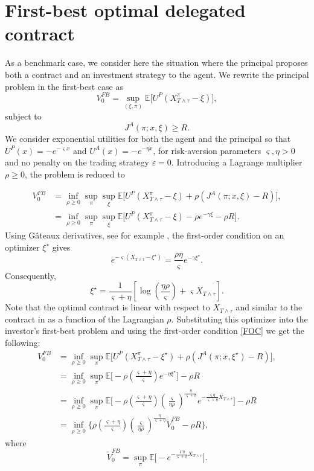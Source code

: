 \documentclass[11pt,a4paper]{article}
\theoremstyle{thmstyleone}%
\theoremstyle{thmstyletwo}%
\theoremstyle{thmstylethree}%
\begin{document}
\newpage
\appendix

\section{First-best optimal delegated contract}\label{FB-appendix}
As a benchmark case, we consider here the situation where the principal proposes both a contract and an investment strategy to the agent. We rewrite the principal problem in the first-best case as 
\[V^{FB}_0=\sup_{(\xi,\pi)} \mathbb E\Big[U^P(X^\pi_{T\wedge \tau}-\xi)\Big],\]
subject to 
\[J^A(\pi;x,\xi)\geq R.\]
We consider exponential utilities for both the agent and the principal so that $U^P(x)=-e^{-\varsigma x}$ and $U^A(x)=-e^{-\eta x}$, for risk-aversion parameters $\varsigma,\eta>0$ and no penalty on the trading strategy $\varepsilon=0$. 
Introducing a Lagrange multiplier $\rho\geq 0$, the problem is reduced to

\begin{align*}
V^{FB}_0&=\inf_{\rho\geq 0}\sup_{\pi}\sup_{\xi} \mathbb E\Big[U^P(X^\pi_{T\wedge \tau}-\xi)+\rho (J^A(\pi;x,\xi)-R) \Big],\\
&=\inf_{\rho\geq 0}\sup_{\pi}\sup_{\xi} \mathbb E\Big[U^P(X^\pi_{T\wedge \tau}-\xi)-\rho e^{-\gamma \xi}  -\rho R \Big].
\end{align*}
Using G\^ateaux derivatives, see for example \cite{mastrolia2018moral}, the first-order condition on an optimizer $\xi^\star$ gives
\begin{equation}\label{FOC}e^{-\varsigma (X_{T\wedge \tau}-\xi^\star)}=\frac{\rho \eta}\varsigma e^{-\gamma \xi^\star}.\end{equation}
Consequently,
\[\xi^\star= \frac1{\varsigma+\eta} [\log(\frac{\eta\rho}\varsigma)+\varsigma X_{T\wedge \tau}].\]
Note that the optimal contract is linear with respect to $X_{T\wedge \tau}$ and similar to the contract in \cite[Section 2.1]{cvitanic2017moral} as a function of the Lagrangian $\rho$. Substituting this optimizer into the investor's first-best problem and using the first-order condition \eqref{FOC} we get the following:
\begin{align*}
V^{FB}_0&=\inf_{\rho\geq 0}\sup_{\pi} \mathbb E\Big[U^P(X^\pi_{T\wedge \tau}-\xi^\star)+\rho (J^A(\pi;x,\xi^\star)-R) \Big],\\
&=\inf_{\rho\geq 0}\sup_{\pi} \mathbb E\Big[ -\rho(\frac{\varsigma+\eta}{\varsigma})e^{-\eta \xi^\star}\Big] -\rho R\\
&=\inf_{\rho\geq 0}\sup_{\pi} \mathbb E\Big[ -\rho(\frac{\varsigma+\eta}{\varsigma})   (\frac{\varsigma}{\eta\rho})^{\frac\eta{\varsigma+\eta}}e^{-\frac{\varsigma\eta}{\varsigma+\eta}X_{T\wedge \tau}}\Big] -\rho R\\
&=\inf_{\rho\geq 0} \big\{ \rho(\frac{\varsigma+\eta}{\varsigma})   (\frac{\varsigma}{\eta\rho})^{\frac\eta{\varsigma+\eta}}\tilde V_0^{FB} -\rho R\Big\},
\end{align*}
where 
\[\tilde V_0^{FB}=\sup_\pi \mathbb E\Big[-e^{-\frac{\varsigma\eta}{\varsigma+\eta} X_{T\wedge \tau}}\Big].\]
\end{document}

